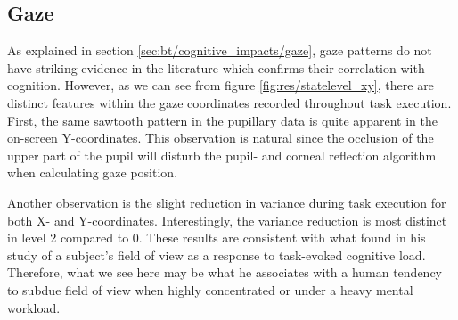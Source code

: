 \subsection{Gaze}

As explained in section \ref{sec:bt/cognitive_impacts/gaze}, gaze patterns do not have striking evidence in the literature which confirms their correlation with cognition. However, as we can see from figure \ref{fig:res/statelevel_xy}, there are distinct features within the gaze coordinates recorded throughout task execution. First, the same sawtooth pattern in the pupillary data is quite apparent in the on-screen Y-coordinates. This observation is natural since the occlusion of the upper part of the pupil will disturb the pupil- and corneal reflection algorithm when calculating gaze position.

Another observation is the slight reduction in variance during task execution for both X- and Y-coordinates. Interestingly, the variance reduction is most distinct in level 2 compared to 0. These results are consistent with what \textcite{williams1985} found in his study of a subject's field of view as a response to task-evoked cognitive load. Therefore, what we see here may be what he associates with a human tendency to subdue field of view when highly concentrated or under a heavy mental workload.